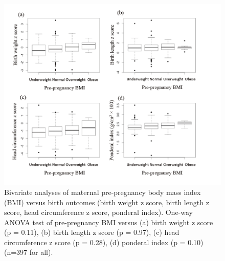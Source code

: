 \begin{figure}
  \centering
    \label{fig:Fig329}
  \includegraphics[scale=1]{Figures/Fig329.pdf}
  \caption[Bivariate analyses of maternal pre-pregnancy body mass index versus birth outcomes (birth weight z score, birth length z score, head circumference z score, ponderal index)]{Bivariate analyses of maternal pre-pregnancy body mass index (BMI) versus birth outcomes (birth weight z score, birth length z score, head circumference z score, ponderal index). One-way ANOVA test of pre-pregnancy BMI versus (a) birth weight z score (p = 0.11), (b) birth length z score (p = 0.97), (c) head circumference z score (p = 0.28), (d) ponderal index (p = 0.10) (n=397 for all).}
\end{figure}

